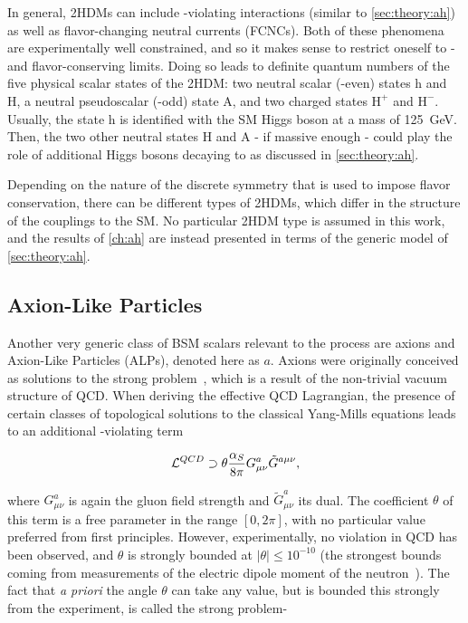 In general, 2HDMs can include \CP-violating interactions (similar to \cref{sec:theory:ah}) as well as flavor-changing neutral currents (FCNCs). Both of these phenomena are experimentally well constrained, and so it makes sense to restrict oneself to \CP- and flavor-conserving limits. Doing so leads to definite quantum numbers of the five physical scalar states of the 2HDM: two neutral scalar (\CP-even) states h and H, a neutral pseudoscalar (\CP-odd) state A, and two charged states $\mathrm{H}^+$ and $\mathrm{H}^-$. Usually, the state h is identified with the SM Higgs boson at a mass of \SI{125}{\GeV}. Then, the two other neutral states H and A - if massive enough - could play the role of additional Higgs bosons decaying to \ttbar as discussed in \cref{sec:theory:ah}.

Depending on the nature of the discrete symmetry that is used to impose flavor conservation, there can be different types of 2HDMs, which differ in the structure of the couplings to the SM. No particular 2HDM type is assumed in this work, and the results of \cref{ch:ah} are instead presented in terms of the generic model of \cref{sec:theory:ah}.

\subsection{Axion-Like Particles}
\label{sec:theory:alps}

Another very generic class of BSM scalars relevant to the \pptt process are axions and Axion-Like Particles (ALPs), denoted here as $a$. 
Axions were originally conceived as solutions to the strong \CP problem~\cite{Peccei:1977hh,Peccei:1977ur,Weinberg:1977ma,Wilczek:1977pj}, which is a result of the non-trivial vacuum structure of QCD. When deriving the effective QCD Lagrangian, the presence of certain classes of topological solutions to the classical Yang-Mills equations leads to an additional \CP-violating term~\cite{DiLuzio:2020wdo}

\begin{equation}
\label{eq:theory:strongcp}
    \mathcal{L}^{QCD} \supset \theta \frac{\alpha_S}{8 \pi} G^{a}_{\mu \nu} \tilde{G}^{a \mu \nu},
\end{equation}

\noindent where $G^{a}_{\mu \nu}$ is again the gluon field strength and $\tilde{G}^{a}_{\mu \nu}$ its dual. The coefficient $\theta$ of this term is a free parameter in the range $[0,2\pi]$, with no particular value preferred from first principles. However, experimentally, no \CP violation in QCD has been observed, and $\theta$ is strongly bounded at $|\theta| \leq 10^{-10}$ (the strongest bounds coming from measurements of the electric dipole moment of the neutron~\cite{DiLuzio:2020wdo,Pendlebury:2015lrz,Abel:2020pzs}). 
The fact that \textit{a priori} the angle $\theta$ can take any value, but is bounded this strongly from the experiment, is called the strong \CP problem-

